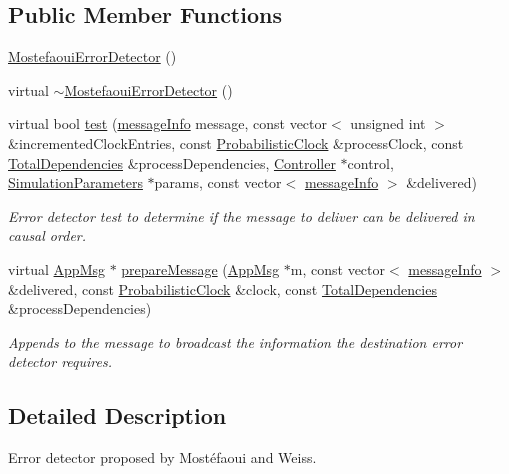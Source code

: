 \subsection*{Public Member Functions}
\begin{DoxyCompactItemize}
\item 
\hyperlink{class_mostefaoui_error_detector_a2a76ea0d2e986ce379c5686f48f887dc}{Mostefaoui\+Error\+Detector} ()
\item 
virtual \hyperlink{class_mostefaoui_error_detector_a8658848d90c291c1364962c0759ca806}{$\sim$\+Mostefaoui\+Error\+Detector} ()
\item 
virtual bool \hyperlink{class_mostefaoui_error_detector_a293f6cf144526bc8694fc4f1fc0daeb5}{test} (\hyperlink{structures_8h_a7e7bdc1d2fff8a9436f2f352b2711ed6}{message\+Info} message, const vector$<$ unsigned int $>$ \&incremented\+Clock\+Entries, const \hyperlink{class_probabilistic_clock}{Probabilistic\+Clock} \&process\+Clock, const \hyperlink{class_total_dependencies}{Total\+Dependencies} \&process\+Dependencies, \hyperlink{class_controller}{Controller} $\ast$control, \hyperlink{class_simulation_parameters}{Simulation\+Parameters} $\ast$params, const vector$<$ \hyperlink{structures_8h_a7e7bdc1d2fff8a9436f2f352b2711ed6}{message\+Info} $>$ \&delivered)
\begin{DoxyCompactList}\small\item\em Error detector test to determine if the message to deliver can be delivered in causal order. \end{DoxyCompactList}\item 
virtual \hyperlink{class_app_msg}{App\+Msg} $\ast$ \hyperlink{class_mostefaoui_error_detector_adcd530d7349df19adb614ca414225214}{prepare\+Message} (\hyperlink{class_app_msg}{App\+Msg} $\ast$m, const vector$<$ \hyperlink{structures_8h_a7e7bdc1d2fff8a9436f2f352b2711ed6}{message\+Info} $>$ \&delivered, const \hyperlink{class_probabilistic_clock}{Probabilistic\+Clock} \&clock, const \hyperlink{class_total_dependencies}{Total\+Dependencies} \&process\+Dependencies)
\begin{DoxyCompactList}\small\item\em Appends to the message to broadcast the information the destination error detector requires. \end{DoxyCompactList}\end{DoxyCompactItemize}


\subsection{Detailed Description}
Error detector proposed by Mostéfaoui and Weiss. 



